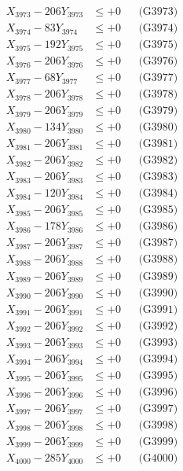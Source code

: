 \documentclass[a4paper,10pt]{article}
\begin{document}
{\begin{align}
X_{3973} - 206Y_{3973} &\leq +0 && \text{(G3973)} \\
X_{3974} - 83Y_{3974} &\leq +0 && \text{(G3974)} \\
X_{3975} - 192Y_{3975} &\leq +0 && \text{(G3975)} \\
X_{3976} - 206Y_{3976} &\leq +0 && \text{(G3976)} \\
X_{3977} - 68Y_{3977} &\leq +0 && \text{(G3977)} \\
X_{3978} - 206Y_{3978} &\leq +0 && \text{(G3978)} \\
X_{3979} - 206Y_{3979} &\leq +0 && \text{(G3979)} \\
X_{3980} - 134Y_{3980} &\leq +0 && \text{(G3980)} \\
\allowbreak
X_{3981} - 206Y_{3981} &\leq +0 && \text{(G3981)} \\
X_{3982} - 206Y_{3982} &\leq +0 && \text{(G3982)} \\
X_{3983} - 206Y_{3983} &\leq +0 && \text{(G3983)} \\
X_{3984} - 120Y_{3984} &\leq +0 && \text{(G3984)} \\
X_{3985} - 206Y_{3985} &\leq +0 && \text{(G3985)} \\
X_{3986} - 178Y_{3986} &\leq +0 && \text{(G3986)} \\
X_{3987} - 206Y_{3987} &\leq +0 && \text{(G3987)} \\
X_{3988} - 206Y_{3988} &\leq +0 && \text{(G3988)} \\
X_{3989} - 206Y_{3989} &\leq +0 && \text{(G3989)} \\
X_{3990} - 206Y_{3990} &\leq +0 && \text{(G3990)} \\
\allowbreak
X_{3991} - 206Y_{3991} &\leq +0 && \text{(G3991)} \\
X_{3992} - 206Y_{3992} &\leq +0 && \text{(G3992)} \\
X_{3993} - 206Y_{3993} &\leq +0 && \text{(G3993)} \\
X_{3994} - 206Y_{3994} &\leq +0 && \text{(G3994)} \\
X_{3995} - 206Y_{3995} &\leq +0 && \text{(G3995)} \\
X_{3996} - 206Y_{3996} &\leq +0 && \text{(G3996)} \\
X_{3997} - 206Y_{3997} &\leq +0 && \text{(G3997)} \\
X_{3998} - 206Y_{3998} &\leq +0 && \text{(G3998)} \\
X_{3999} - 206Y_{3999} &\leq +0 && \text{(G3999)} \\
X_{4000} - 285Y_{4000} &\leq +0 && \text{(G4000)} \\

\end{align}}
\end{document}
